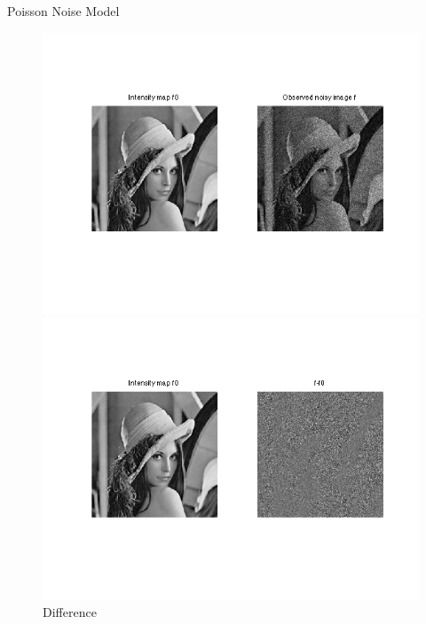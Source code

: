 \documentclass{beamer}
\begin{document}
\begin{frame}{Poisson Noise Model} 
\begin{figure}[!tbp]
  \centering
  \begin{minipage}[b]{0.45\textwidth}
    \includegraphics[width=\textwidth]{poisson_img.png}
    \caption{Poisson Image addition}
  \end{minipage}
  \hfill
  \begin{minipage}[b]{0.45\textwidth}
    \includegraphics[width=\textwidth]{poisson_diff.png}
    \caption{Difference}
  \end{minipage}
\end{figure}
\end{frame}
\end{document}
